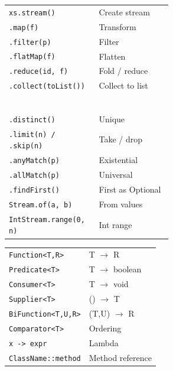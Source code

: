 \documentclass[10pt]{extarticle}
\begin{document}
\begin{multicols}{2}
\begin{tabularx}{\linewidth}{@{}>{\raggedright\arraybackslash}p{0.55\linewidth}@{\enspace}Y@{}}
\texttt{xs.stream()}                 & Create stream \\
\texttt{.map(f)}                     & Transform \\
\texttt{.filter(p)}                  & Filter \\
\texttt{.flatMap(f)}                 & Flatten \\
\texttt{.reduce(id, f)}             & Fold / reduce \\
\texttt{.collect(toList())}          & Collect to list \\
 & \\
 \\
 & \\
 \\
 & \\
 \\
\texttt{.distinct()}                 & Unique \\
\texttt{.limit(n) / .skip(n)}       & Take / drop \\
\texttt{.anyMatch(p)}               & Existential \\
\texttt{.allMatch(p)}               & Universal \\
\texttt{.findFirst()}               & First as Optional \\
\texttt{Stream.of(a, b)}            & From values \\
\texttt{IntStream.range(0, n)}      & Int range \\
\end{tabularx}

\begin{tabularx}{\linewidth}{@{}l@{\enspace}Y@{}}
\texttt{Function<T,R>}              & T $\to$ R \\
\texttt{Predicate<T>}               & T $\to$ boolean \\
\texttt{Consumer<T>}                & T $\to$ void \\
\texttt{Supplier<T>}                & () $\to$ T \\
\texttt{BiFunction<T,U,R>}          & (T,U) $\to$ R \\
\texttt{Comparator<T>}              & Ordering \\
\texttt{x -> expr}                   & Lambda \\
\texttt{ClassName::method}           & Method reference \\
\end{tabularx}


\end{multicols}
\end{document}
